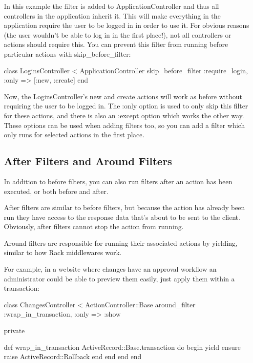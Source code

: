 \documentclass[10pt]{book}
\newenvironment{code}{%
  \scriptsize
    \verbatim
}{%
    \endverbatim
    \newline
}
\begin{document}
In this example the filter is added to ApplicationController  and thus all controllers in the application inherit it. This will make  everything in the application require the user to be logged in in order  to use it. For obvious reasons (the user wouldn’t be able to log in in  the first place!), not all controllers or actions should require this.  You can prevent this filter from running before particular actions with skip\_before\_filter:
\begin{code}
class LoginsController < ApplicationController
  skip_before_filter :require_login, :only => [:new, :create]
end
\end{code}

Now, the LoginsController’s new and create actions will work as before without requiring the user to be logged in. The :only option is used to only skip this filter for these actions, and there is also an :except  option which works the other way. These options can be used when adding  filters too, so you can add a filter which only runs for selected  actions in the first place.

\subsection{ After Filters and Around Filters}

In addition to before filters, you can also run filters after an action has been executed, or both before and after.

After filters are similar to before filters, but because the action  has already been run they have access to the response data that’s about  to be sent to the client. Obviously, after filters cannot stop the  action from running.

Around filters are responsible for running their associated actions by yielding, similar to how Rack middlewares work.

For example, in a website where changes have an approval workflow an  administrator could be able to preview them easily, just apply them  within a transaction:
\begin{code}
class ChangesController < ActionController::Base
  around_filter :wrap_in_transaction, :only => :show
 
  private
 
  def wrap_in_transaction
    ActiveRecord::Base.transaction do
      begin
        yield
      ensure
        raise ActiveRecord::Rollback
      end
    end
  end
end
\end{code}
\end{document}
